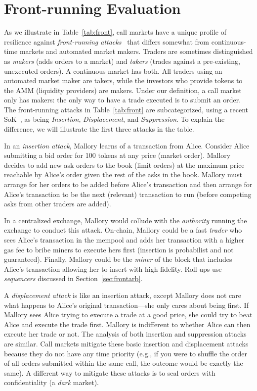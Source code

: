 \section{Front-running Evaluation} 
\label{sec:front}



As we illustrate in Table~\ref{tab:front}, call markets have a unique profile of resilience against \emph{front-running attacks}~\cite{clark2014decentralizing,eskandari2019sok,daian2019flash} that differs somewhat from continuous-time markets and automated market makers. Traders are sometimes distinguished as \emph{makers} (adds orders to a market) and \emph{takers} (trades against a pre-existing, unexecuted orders). A continuous market has both. All traders using an automated market maker are takers, while the investors who provide tokens to the AMM (liquidity providers) are makers. Under our definition, a call market only has makers: the only way to have a trade executed is to submit an order. The front-running attacks in Table~\ref{tab:front} are subcategorized, using a recent SoK~\cite{eskandari2019sok}, as being \emph{Insertion}, \emph{Displacement}, and \emph{Suppression}. To explain the difference, we will illustrate the first three attacks in the table.

In an \emph{insertion attack}, Mallory learns of a transaction from Alice. Consider Alice submitting a bid order for 100 tokens at any price (market order). Mallory decides to add new ask orders to the book (limit orders) at the maximum price reachable by Alice's order given the rest of the asks in the book. Mallory must arrange for her orders to be added before Alice's transaction and then arrange for Alice's transaction to be the next (relevant) transaction to run (\eg before competing asks from other traders are added).

In a centralized exchange, Mallory would collude with the \emph{authority} running the exchange to conduct this attack. On-chain, Mallory could be a fast \emph{trader} who sees Alice's transaction in the mempool and adds her transaction with a higher gas fee to bribe miners to execute hers first (insertion is probabilist and not guaranteed). Finally, Mallory could be the \emph{miner} of the block that includes Alice's transaction allowing her to insert with high fidelity. Roll-ups use \emph{sequencers} discussed in Section~\ref{sec:frontarb}.

A \emph{displacement attack} is like an insertion attack, except Mallory does not care what happens to Alice's original transaction---she only cares about being first. If Mallory sees Alice trying to execute a trade at a good price, she could try to beat Alice and execute the trade first. Mallory is indifferent to whether Alice can then execute her trade or not. The analysis of both insertion and suppression attacks are similar.  Call markets mitigate these basic insertion and displacement attacks because they do not have any time priority (e.g., if you were to shuffle the order of all orders submitted within the same call, the outcome would be exactly the same). A different way to mitigate these attacks is to seal orders with confidentiality (a \textit{dark} market).


